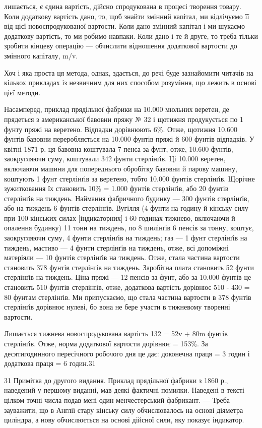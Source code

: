лишається, є єдина вартість, дійсно спродукована в процесі творення товару. Коли додаткову вартість
дано, то, щоб знайти змінний капітал, ми відлічуємо її від цієї новоспродукованої вартости.
Коли дано змінний капітал і ми шукаємо додаткову вартість, то ми робимо навпаки. Коли дано і те й
друге, то треба тільки зробити кінцеву операцію — обчислити відношення додаткової вартости до
змінного капіталу, m/v.

Хоч і яка проста ця метода, однак, здається, до речі буде зазнайомити читачів на кількох прикладах
із незвичним для них
способом розуміння, що лежить в основі цієї методи.

Насамперед, приклад прядільної фабрики на 10.000 мюльних веретен, де прядеться з американської
бавовни пряжу № 32 і
щотижня продукується по 1 фунту пряжі на веретено. Відпадки дорівнюють 6\%. Отже, щотижня 10.600
фунтів бавовни переробляється на 10.000 фунтів пряжі й 600 фунтів відпадків. У квітні 1871 р. ця
бавовна коштувала 7 пенса за фунт, отже, 10.600 фунтів, заокругляючи суму, коштували 342 фунти
стерлінґів. Ці 10.000
веретен, включаючи машини для попереднього обробітку бавовни й парову машину, коштують 1 фунт
стерлінґів за веретено, тобто 10.000 фунтів стерлінґів. Щорічне зужитковання їх становить
10\% = 1.000 фунтів стерлінґів, або 20 фунтів стерлінґів на тиждень. Наймання фабричного будинку —
300 фунтів стерлінґів, або на тиждень 6 фунтів стерлінґів. Вугілля (4 фунти на годину
й кінську силу при 100 кінських силах [індикаторних] і 60 годинах тижнево, включаючи й опалення
будинку) 11 тонн
на тиждень, по 8 шилінґів 6 пенсів за тонну, коштує, заокругляючи суму, 4 фунти стерлінґів на
тиждень; газ — 1 фунт стерлінґів на тиждень, мастиво — 4 фунти стерлінґів на тиждень, отже, всі
допоміжні матеріяли — 10 фунтів стерлінґів на тиждень. Отже, стала частина вартости становить 378
фунтів стерлінґів
на тиждень. Заробітна плата становить 52 фунти стерлінґів на тиждень. Ціна пряжі — 12 пенсів за
фунт, або за 10.000 фунтів
це становить 510 фунтів стерлінґів, отже, додаткова вартість дорівнює 510 - 430 = 80 фунтам
стерлінґів. Ми припускаємо, що стала частина вартости в 378 фунтів стерлінґів дорівнює нулеві, бо
вона не бере участи в тижневому творенні вартости.

Лишається тижнева новоспродукована вартість 132 = 52v + 80m фунтів стерлінґів. Отже, норма
додаткової вартости дорівнює
 = 153\%. За десятигодинного пересічного робочого дня це дає: доконечна праця = 3
годин і додаткова праця = 6 годин.31

31 Примітка до другого видання. Приклад прядільної фабрики з 1860 р., наведений у першому виданні,
мав деякі фактичні помилки. Наведені в тексті цілком точні числа подав мені один менчестерський
фабрикант. — Треба зауважити, що в Англії стару кінську силу обчислювалось
на основі діяметра циліндра, а нову обчислюється на основі дійсної сили, яку показує індикатор.
